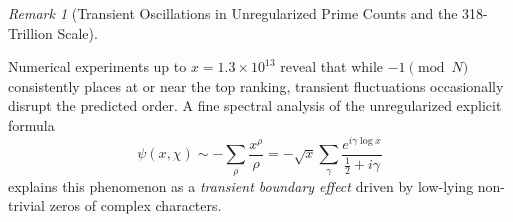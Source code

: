 \documentclass[12pt,reqno]{amsart}
\theoremstyle{definition}
\theoremstyle{remark}
\newtheorem{remark}[theorem]{Remark}
\numberwithin{equation}{section}
\begin{document}
\begin{remark}[Transient Oscillations in Unregularized Prime Counts and the 318-Trillion Scale]
\begin{table}[htbp]
\begin{subtable}[t]{\textwidth}
\centering
{}
\label{tab:N19}
\end{subtable}

\vspace{1.5em}

\begin{subtable}[t]{\textwidth}
\centering
{}
\label{tab:N23}
\end{subtable}
\end{table}

Numerical experiments up to $x = 1.3 \times 10^{13}$ reveal that while $-1 \pmod N$ consistently places at or near the top ranking, transient fluctuations occasionally disrupt the predicted order. A fine spectral analysis of the unregularized explicit formula
\begin{equation}
\psi(x, \chi) \sim - \sum_{\rho} \frac{x^\rho}{\rho} = - \sqrt{x} \sum_{\gamma} \frac{e^{i\gamma \log x}}{\frac{1}{2} + i\gamma}
\end{equation}
explains this phenomenon as a \emph{transient boundary effect} driven by low-lying non-trivial zeros of complex characters.


\end{remark}
\end{document}
